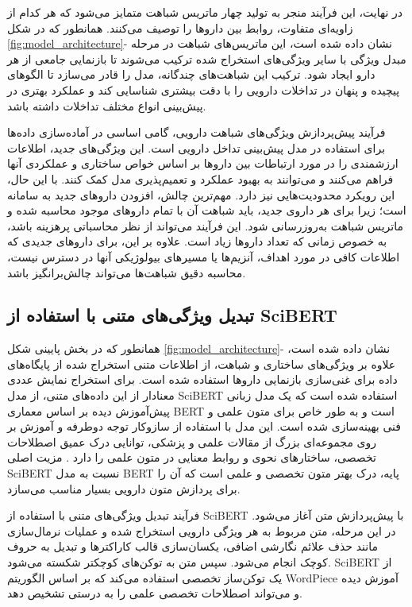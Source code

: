 در نهایت، این فرآیند منجر به تولید چهار ماتریس شباهت متمایز می‌شود که هر کدام از زاویه‌ای متفاوت، روابط بین داروها را توصیف می‌کنند. همانطور که در شکل \ref{fig:model_architecture}- نشان داده شده است، این ماتریس‌های شباهت در مرحله مبدل ویژگی با سایر ویژگی‌های استخراج شده ترکیب می‌شوند تا بازنمایی جامعی از هر دارو ایجاد شود. ترکیب این شباهت‌های چندگانه، مدل را قادر می‌سازد تا الگوهای پیچیده و پنهان در تداخلات دارویی را با دقت بیشتری شناسایی کند و عملکرد بهتری در پیش‌بینی انواع مختلف تداخلات داشته باشد.

فرآیند پیش‌پردازش ویژگی‌های شباهت دارویی، گامی اساسی در آماده‌سازی داده‌ها برای استفاده در مدل پیش‌بینی تداخل دارویی است. این ویژگی‌های جدید، اطلاعات ارزشمندی را در مورد ارتباطات بین داروها بر اساس خواص ساختاری و عملکردی آنها فراهم می‌کنند و می‌توانند به بهبود عملکرد و تعمیم‌پذیری مدل کمک کنند. با این حال، این رویکرد محدودیت‌هایی نیز دارد. مهم‌ترین چالش، افزودن داروهای جدید به سامانه است؛ زیرا برای هر داروی جدید، باید شباهت آن با تمام داروهای موجود محاسبه شده و ماتریس شباهت به‌روزرسانی شود. این فرآیند می‌تواند از نظر محاسباتی پرهزینه باشد، به خصوص زمانی که تعداد داروها زیاد است. علاوه بر این، برای داروهای جدیدی که اطلاعات کافی در مورد اهداف، آنزیم‌ها یا مسیرهای بیولوژیکی آنها در دسترس نیست، محاسبه دقیق شباهت‌ها می‌تواند چالش‌برانگیز باشد.

\subsection{تبدیل ویژگی‌های متنی با استفاده از SciBERT}

همانطور که در بخش پایینی شکل \ref{fig:model_architecture}- نشان داده شده است، علاوه بر ویژگی‌های ساختاری و شباهت، از اطلاعات متنی استخراج شده از پایگاه‌های داده برای غنی‌سازی بازنمایی داروها استفاده شده است. برای استخراج نمایش عددی معنادار از این داده‌های متنی، از مدل SciBERT استفاده شده است که یک مدل زبانی پیش‌آموزش دیده بر اساس معماری BERT \cite{ref_devlin2018} است و به طور خاص برای متون علمی و فنی بهینه‌سازی شده است. این مدل با استفاده از سازوکار توجه دوطرفه و آموزش بر روی مجموعه‌ای بزرگ از مقالات علمی و پزشکی، توانایی درک عمیق اصطلاحات تخصصی، ساختارهای نحوی و روابط معنایی در متون علمی را دارد \cite{ref_beltagy2019}. مزیت اصلی SciBERT نسبت به مدل BERT پایه، درک بهتر متون تخصصی و علمی است که آن را برای پردازش متون دارویی بسیار مناسب می‌سازد.

فرآیند تبدیل ویژگی‌های متنی با استفاده از SciBERT با پیش‌پردازش متن آغاز می‌شود. در این مرحله، متن مربوط به هر ویژگی دارویی استخراج شده و عملیات نرمال‌سازی مانند حذف علائم نگارشی اضافی، یکسان‌سازی قالب کاراکترها و تبدیل به حروف کوچک انجام می‌شود. سپس متن به توکن‌های کوچکتر شکسته می‌شود. SciBERT از یک توکن‌ساز تخصصی استفاده می‌کند که بر اساس الگوریتم WordPiece آموزش دیده و می‌تواند اصطلاحات تخصصی علمی را به درستی تشخیص دهد.

